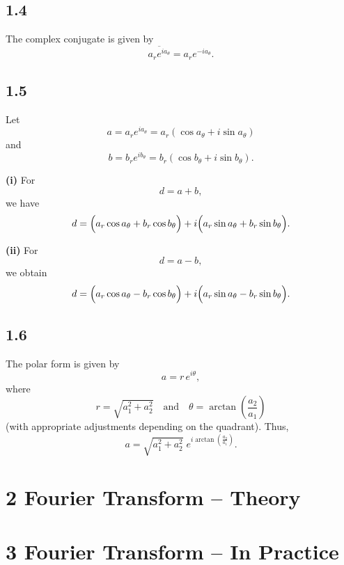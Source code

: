 \documentclass[12pt]{article}
\begin{document}
\subsection{1.4}

The complex conjugate is given by
\[
\overline{a_r e^{i a_\theta}} = a_r e^{-i a_\theta}.
\]

\subsection{1.5}

Let 
\[
a = a_r e^{i a_\theta} = a_r (\cos a_\theta + i\sin a_\theta)
\]
and
\[
b = b_r e^{i b_\theta} = b_r (\cos b_\theta + i\sin b_\theta).
\]

\textbf{(i)} For 
\[
d = a + b,
\]
we have
\[
d = \Bigl(a_r\cos a_\theta + b_r\cos b_\theta\Bigr) + i\Bigl(a_r\sin a_\theta + b_r\sin b_\theta\Bigr).
\]

\textbf{(ii)} For 
\[
d = a - b,
\]
we obtain
\[
d = \Bigl(a_r\cos a_\theta - b_r\cos b_\theta\Bigr) + i\Bigl(a_r\sin a_\theta - b_r\sin b_\theta\Bigr).
\]

\subsection{1.6}

The polar form is given by
\[
a = r\, e^{i\theta},
\]
where
\[
r = \sqrt{a_1^2 + a_2^2} \quad \text{and} \quad \theta = \arctan\!\left(\frac{a_2}{a_1}\right)
\]
(with appropriate adjustments depending on the quadrant). Thus,
\[
a = \sqrt{a_1^2+a_2^2}\; e^{i\arctan\!\left(\frac{a_2}{a_1}\right)}.
\]


\section{2 Fourier Transform – Theory}

\section{3 Fourier Transform – In Practice}
\end{document}
